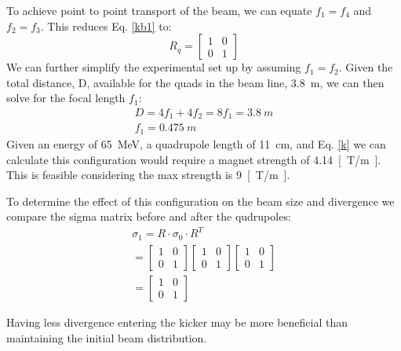 To achieve point to point transport of the beam, we can 
equate $f_1 = f_4$ and $f_2 = f_3$. This reduces Eq. \ref{kb1} to:
 \begin{equation}
R_q =
\begin{bmatrix}
1 & 0 \\
0 & 1	
\end{bmatrix}
\end{equation}
We can further simplify the experimental set up by 
assuming $f_1=f_2$. Given the total distance, D, available for the
quads in the beam line, \SI{3.8}{m}, we can then solve
for the focal length $f_1$: 
\begin{align}
	D = 4f_1 + 4 f_2 = 8f_1 = \SI{3.8}{m} \\
	f_1 = \SI{0.475}{m}
\end{align}
Given an energy of \SI{65}{MeV}, a quadrupole length of \SI{11}{cm}, 
and Eq. \ref{k} we can calculate this configuration would require a 
magnet strength of \SI{4.14}{[T/m]}. This is feasible considering the 
max strength is \SI{9}{[T/m]}.

To determine the effect of this configuration on the beam size and divergence
we compare the sigma matrix before and after the qudrupoles:
\begin{align}
	\sigma_1 = R\cdot \sigma_0 \cdot R^T \\
	= 
	\begin{bmatrix}
	1 & 0 \\
	0 & 1	
	\end{bmatrix}
	\begin{bmatrix}
	1 & 0 \\
	0 & 1	
	\end{bmatrix}
    \begin{bmatrix}
	1 & 0 \\
	0 & 1	
	\end{bmatrix} \\
	=
	\begin{bmatrix}
	1 & 0 \\
	0 & 1	
	\end{bmatrix}
\end{align}

Having less divergence entering the kicker may be more beneficial than 
maintaining the initial beam distribution. 

